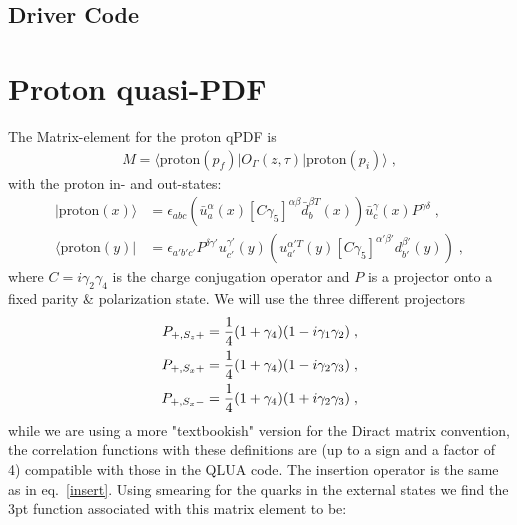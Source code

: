 \documentclass[a4paper,10pt]{scrartcl}
\begin{document}
\subsection{Driver Code}



\section{Proton quasi-PDF}
The Matrix-element for the proton qPDF is
\begin{align}
    M = \langle \text{proton}(p_f) | O_\Gamma(z,\tau) | \text{proton}(p_i) \rangle \; ,
\end{align}
with the proton in- and out-states:
\begin{align}
    | \text{proton}(x) \rangle &= \epsilon_{abc} (\bar u^\alpha_a(x) [C \gamma_5]^{\alpha \beta} \bar d^{\beta T}_b(x)) \bar u^\gamma_c(x) P^{\gamma \delta} \; , \\
    \langle \text{proton}(y) | &= \epsilon_{a'b'c'} P^{\delta \gamma'} u^{\gamma'}_{c'}(y) (u^{\alpha' T}_{a'}(y) [C \gamma_5]^{\alpha' \beta'} d^{\beta'}_{b'}(y) ) \; ,
\end{align}
where $C=i \gamma_2 \gamma_4$ is the charge conjugation operator and $P$ is a projector onto a fixed parity \& polarization state. We will use the three different projectors   
\begin{align}
    P_{+,S_z+} &= \frac{1}{4} (1+ \gamma_4)(1-i\gamma_1 \gamma_2) \;, \notag \\
    P_{+,S_x+} &= \frac{1}{4} (1+ \gamma_4)(1-i\gamma_2 \gamma_3) \; ,\\
    P_{+,S_x-} &= \frac{1}{4} (1+ \gamma_4)(1+i\gamma_2 \gamma_3) \;, \notag
\end{align}
while we are using a more "textbookish" version for the Diract matrix convention, the correlation functions with these definitions are (up to a sign and a factor of 4) compatible with those 
in the QLUA code. The insertion operator is the same as in eq.~\eqref{insert}. Using smearing for the quarks in the external 
states we find the 3pt function associated with this matrix element to be:
\end{document}
